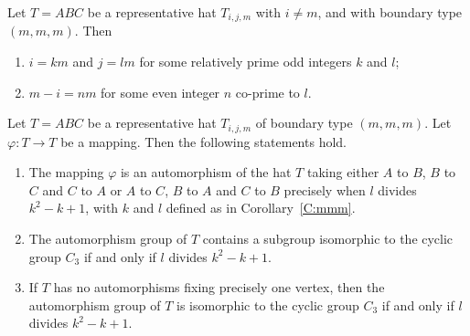 \documentclass[10pt,a4paper]{amsart}
\def\p{\varphi}
\begin{document}
\begin{corollary}\label{C:mmm}
Let $T = ABC$ be a representative hat $T_{i,j,m}$ with $i \neq m$, and with boundary type
$(m,m,m)$. Then
\begin{enumerate}
\item[(a)] $i = km$ and $j = lm$ for some relatively prime odd integers $k$ and $l$;
\item[(b)] $m - i = nm$ for some even integer $n$ co-prime to $l$.
\end{enumerate}
\end{corollary}

\begin{proposition}\label{P:mmm}
Let $T = ABC$ be a representative hat $T_{i,j,m}$ of boundary type $(m,m,m)$. Let $\p: T
\rightarrow T$ be a mapping. Then the following statements hold.
\begin{enumerate}
\item[(a)] The mapping $\p$ is an automorphism of the hat $T$ taking either $A$ to $B$, $B$ to $C$ and $C$ to $A$ or $A$ to $C$, $B$ to $A$ and $C$ to $B$ precisely when $l$ divides $k^2 - k + 1$, with $k$ and $l$ defined as in Corollary~\ref{C:mmm}.
\item[(b)] The automorphism group of $T$ contains a subgroup isomorphic to the cyclic group
    $C_3$ if and only if $l$ divides $k^2 - k + 1$.
\item[(c)] If $T$ has no automorphisms fixing precisely one vertex, then the automorphism
    group of $T$ is isomorphic to the cyclic group $C_3$ if and only if $l$ divides $k^2 - k + 1$.
\end{enumerate}
\end{proposition}
\end{document}
